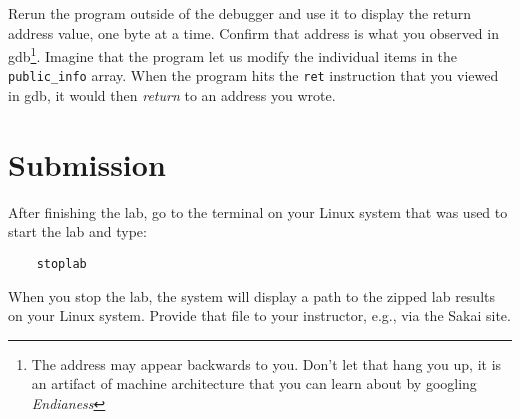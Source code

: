 Rerun the program outside of the debugger and use it to display the return address value, one byte at a time.
Confirm that address is what you observed in gdb\footnote{The address may appear backwards to you.  Don't let 
that hang you up, it is an artifact of machine architecture that you can learn about 
by googling \textit{Endianess}}.  Imagine that the program let us modify the individual 
items in the {\tt public\_info} array.  When the program hits the {\tt ret} instruction that you viewed
in gdb, it would then \textit{return} to an address you wrote.

\section{Submission}
After finishing the lab, go to the terminal on your Linux system that was used to start the lab and type:
\begin{verbatim}
    stoplab 
\end{verbatim}
When you stop the lab, the system will display a path to the zipped lab results on your Linux system.  Provide that file to 
your instructor, e.g., via the Sakai site.

\copyrightnotice


